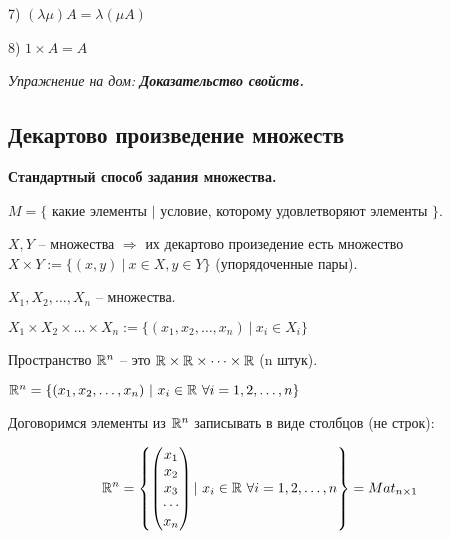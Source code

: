 7) $(\lambda \mu) A = \lambda (\mu A)$

8) $1 \times A = A$

\vspace{\baselineskip}
\textit{Упражнение на дом:} \textbf{\textit{Доказательство свойств.}}

\vspace{\baselineskip}
\begin{comment}
	Свойства (1)-(8) означают, что $Mat_{m\times n}$ является             векторным пространством.
\end{comment}

\vspace{\baselineskip}
\subsection{Декартово произведение множеств}

\vspace{\baselineskip}
\textbf{Стандартный способ задания множества.}

\vspace{\baselineskip}
$M = \{$ какие элементы $|$ условие, которому удовлетворяют элементы $\}$.

\vspace{\baselineskip}
$X, Y$ -- множества $\Rightarrow$ их декартово произедение есть множество $X \times Y := \{ (x, y) \ | \ x \in X, y \in Y\}$ (упорядоченные пары).

$X_1, X_2, \dots, X_n$ -- множества.

$X_1 \times X_2 \times \dots \times X_n := \{(x_1, x_2, \dots, x_n) \ | \ x_i \in X_i\}$

Пространство $\mathbb{R}^n$ -- это $\mathbb{R} \times \mathbb{R} \times \cdots \times \mathbb{R}$ (n штук).

$\RR^n = \{ (x_1, x_2, \dots, x_n) \ | \ x_i \in \RR \  \forall i = 1, 2, \dots, n \}$

\vspace{\baselineskip}
Договоримся элементы из $\mathbb{R}^n$ записывать в виде столбцов (не строк):

\begin{equation*} \mathbb{R}^n = \left\{ \begin{pmatrix}
    x_1 \\
    x_2 \\
    x_3 \\
    \cdots \\
    x_n
	\end{pmatrix} | \ x_i \in \mathbb{R} \ \forall i = 1, 2, \dots , n \right\} = Mat_{n \times 1}
\end{equation*}

